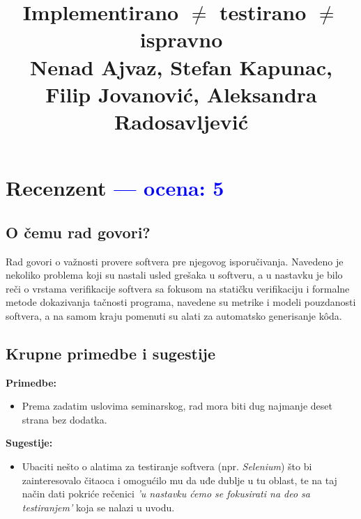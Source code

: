 \documentclass[a4paper]{report}
\newcommand{\odgovor}[1]{\textcolor{blue}{#1}}
\begin{document}
\title{Implementirano $\neq$ testirano $\neq$ ispravno\\
\small{\normalsize{Nenad Ajvaz, Stefan Kapunac, Filip Jovanović, Aleksandra Radosavljević}}}

\maketitle

\tableofcontents

\chapter{Recenzent \odgovor{--- ocena: 5} }

\section{O čemu rad govori?}
Rad govori o važnosti provere softvera pre njegovog isporučivanja. Navedeno je nekoliko problema koji su nastali usled grešaka u softveru, a u nastavku je bilo reči o vrstama verifikacije softvera sa fokusom na statičku verifikaciju i formalne metode dokazivanja tačnosti programa, navedene su metrike i modeli pouzdanosti softvera, a na samom kraju pomenuti su alati za automatsko generisanje kôda.

\section{Krupne primedbe i sugestije}
\textbf{Primedbe:}
\begin{itemize}
    \item Prema zadatim uslovima seminarskog, rad mora biti dug najmanje deset strana bez dodatka.
\end{itemize}

\textbf{Sugestije:}
\begin{itemize}
    \item Ubaciti nešto o alatima za testiranje softvera (npr. \textit{Selenium}) što bi zainteresovalo čitaoca i omogućilo mu da uđe dublje u tu oblast, te na taj način dati pokriće rečenici \textit{'u nastavku ćemo se fokusirati na deo sa testiranjem'} koja se nalazi u uvodu.
\end{itemize}
\end{document}
